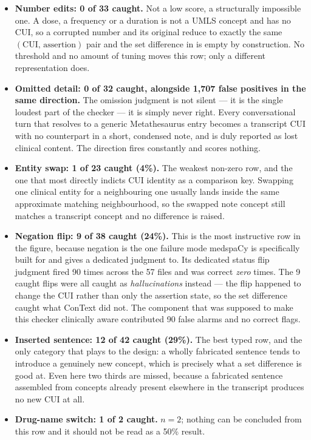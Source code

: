 \begin{itemize}
    \item \textbf{Number edits: 0 of 33 caught.} Not a low score, a structurally
          impossible one. A dose, a frequency or a duration is not a UMLS concept
          and has no CUI, so a corrupted number and its original reduce to exactly
          the same $(\text{CUI},\,\text{assertion})$ pair and the set difference in
           is empty by construction. No threshold and
          no amount of tuning moves this row; only a different representation does.
    \item \textbf{Omitted detail: 0 of 32 caught, alongside 1{,}707 false positives
          in the same direction.} The omission judgment is not silent --- it is the
          single loudest part of the checker --- it is simply never right. Every
          conversational turn that resolves to a generic Metathesaurus entry becomes
          a transcript CUI with no counterpart in a short, condensed note, and is
          duly reported as lost clinical content. The direction fires constantly
          and scores nothing.
    \item \textbf{Entity swap: 1 of 23 caught (4\%).} The weakest non-zero row, and
          the one that most directly indicts CUI identity as a comparison key.
          Swapping one clinical entity for a neighbouring one usually lands inside
          the same approximate matching neighbourhood, so the swapped note concept
          still matches a transcript concept and no difference is raised.
    \item \textbf{Negation flip: 9 of 38 caught (24\%).} This is the most
          instructive row in the figure, because negation is the one failure mode
          medspaCy is specifically built for and gives a dedicated judgment to.
          Its dedicated status flip judgment fired 90 times across the 57 files and
          was correct \emph{zero} times. The 9 caught flips were all caught as
          \emph{hallucinations} instead --- the flip happened to change the CUI
          rather than only the assertion state, so the set difference caught what
          ConText did not. The component that was supposed to make this checker
          clinically aware contributed 90 false alarms and no correct flags.
    \item \textbf{Inserted sentence: 12 of 42 caught (29\%).} The best typed row,
          and the only category that plays to the design: a wholly fabricated
          sentence tends to introduce a genuinely new concept, which is precisely
          what a set difference is good at. Even here two thirds are missed, because
          a fabricated sentence assembled from concepts already present elsewhere in
          the transcript produces no new CUI at all.
    \item \textbf{Drug-name switch: 1 of 2 caught.} $n = 2$; nothing can be
          concluded from this row and it should not be read as a 50\% result.
\end{itemize}


